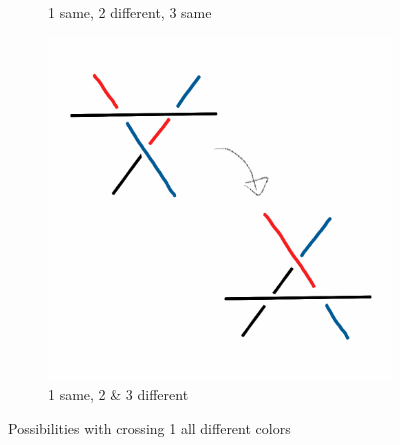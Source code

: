 \documentclass[12pt,letterpaper]{article}
\theoremstyle{definition}
\begin{document}
\begin{figure}[h!]
\begin{subfigure}{.3\textwidth}
        \caption{1 same, 2 different, 3 same}
    \end{subfigure}
    \quad
    \begin{subfigure}{.3\textwidth}
        \centering
        \includegraphics[width=\textwidth]{meeting10pics/1d2d3d.png}
        \caption{1 same, 2 \& 3 different}
    \end{subfigure}
    \caption{Possibilities with crossing 1 all different colors}
\end{figure}
\end{document}
